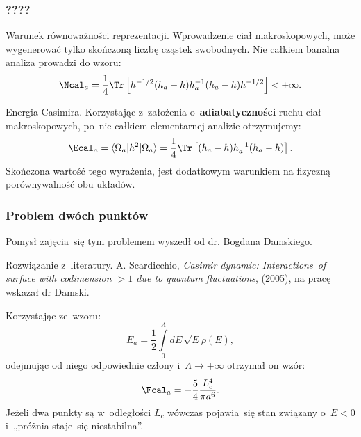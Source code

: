\documentclass[10pt,t]{beamer}
\begin{document}
\begin{frame}
  \frametitle{????}


  Warunek równoważności reprezentacji. Wprowadzenie ciał makroskopowych,
  może wygenerować tylko skończoną liczbę cząstek swobodnych. Nie całkiem
  banalna analiza prowadzi do wzoru:
  \begin{equation}
    \label{eq:Efekt-Casimira-13}
    \Ncal_{ a } =
    \frac{ 1 }{ 4 } \Tr\left[ h^{ -1/2 } ( h_{ a } - h ) h_{ a }^{ -1 }
      ( h_{ a } - h ) h^{ -1/2 } \right]
    < +\infty.
  \end{equation}



  Energia Casimira. Korzystając z~założenia o~\textbf{adiabatyczności}
  ruchu ciał makroskopowych, po~nie całkiem elementarnej analizie
  otrzymujemy:
  \begin{equation}
    \label{eq:Efekt-Casimira-14}
    \Ecal_{ a } =
    \langle \Omega_{ a } | h^{ 2 } | \Omega_{ a } \rangle =
    \frac{ 1 }{ 4 } \Tr\left[ ( h_{ a } - h ) h_{ a }^{ -1 }
      ( h_{ a } - h ) \right].
  \end{equation}
  Skończona wartość tego wyrażenia, jest dodatkowym warunkiem na
  fizyczną porównywalność obu układów.

\end{frame}





\begin{frame}
  \frametitle{Problem dwóch punktów}


  Pomysł zajęcia~się tym problemem wyszedł od dr. Bogdana Damskiego.

  Rozwiązanie z~literatury. A. Scardicchio, \textit{Casimir dynamic:
    Interactions~of surface with codimension $> 1$ due to quantum
    fluctuations}, (2005), na pracę wskazał dr Damski.

  Korzystając ze~wzoru:
  \begin{equation}
    \label{eq:Efekt-Casimira-15}
    E_{ a } =
    \frac{ 1 }{ 2 } \int\limits_{ 0 }^{ \Lambda } dE \, \sqrt{E} \rho( E ),
  \end{equation}
  odejmując od niego odpowiednie człony
  i~$\Lambda \to +\infty$ otrzymał on wzór:
  \begin{equation}
    \label{eq:Efekt-Casimira-16}
    \Fcal_{ a } =
    -\frac{ 5 }{ 4 } \frac{ L_{ c }^{ 4 } }{ \pi a^{ 6 } }.
  \end{equation}
  Jeżeli dwa punkty są w~odległości $L_{ c }$ wówczas pojawia~się
  stan związany o~$E < 0$ i~„próżnia staje~się niestabilna”.

\end{frame}
\end{document}
